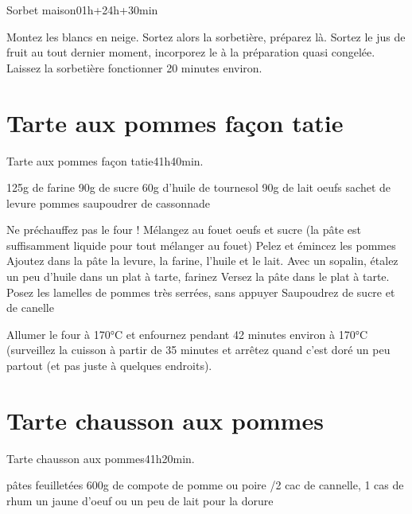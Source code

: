 {\begin{recette}{Sorbet maison}{0}{1h+24h+30min}{}
\begin{preparation}
\etape Montez les blancs en neige.
\etape Sortez alors la sorbetière, préparez là.
\etape Sortez le jus de fruit au tout dernier moment, incorporez le à la préparation quasi congelée.
\etape Laissez la sorbetière fonctionner 20 minutes environ.
\end{preparation}
\end{recette}

\section{Tarte aux pommes façon tatie}
\begin{recette}{Tarte aux pommes façon tatie}{4}{1h}{40min.}
\begin{ingredients}
\ingredient 125g de farine
\ingredient 90g de sucre
\ingredient 60g d'huile de tournesol
\ingredient 90g de lait
 oeufs
 sachet de levure
 pommes
\ingredient saupoudrer de cassonnade
\end{ingredients}

\begin{preparation}
\etape Ne préchauffez pas le four !
\etape Mélangez au fouet oeufs et sucre (la pâte est suffisamment liquide pour tout mélanger au fouet)
\etape Pelez et émincez les pommes
\etape Ajoutez dans la pâte la levure, la farine, l'huile et le lait. 
\etape Avec un sopalin, étalez un peu d'huile dans un plat à tarte, farinez
\etape Versez la pâte dans le plat à tarte. 
\etape Posez les lamelles de pommes très serrées, sans appuyer
\etape Saupoudrez de sucre et de canelle
\end{preparation}



\begin{cuisson}
Allumer le four à 170°C et enfournez pendant 42 minutes environ à 170°C (surveillez la cuisson à partir de 35 minutes et arrêtez quand c'est doré un peu partout (et pas juste à quelques endroits).
\end{cuisson}
\end{recette}

\section{Tarte chausson aux pommes}
\begin{recette}{Tarte chausson aux pommes}{4}{1h}{20min.}
\begin{ingredients}
 pâtes feuilletées
\ingredient 600g de compote de pomme ou poire
/2 cac de cannelle, 1 cas de rhum
\ingredient un jaune d'oeuf ou un peu de lait pour la dorure
\end{ingredients}


\end{recette}}

